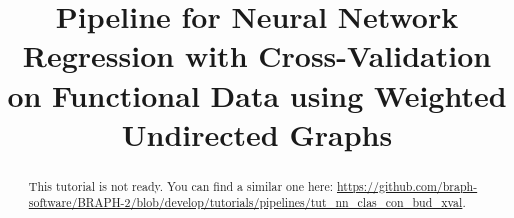 \documentclass[justified]{tufte-handout}
\title[Regression Cross-Validation Functional WU Measure]{Pipeline for Neural Network Regression with Cross-Validation on Functional Data using Weighted Undirected Graphs}
\begin{document}
\maketitle

\begin{abstract}
\noindent
This tutorial is not ready. You can find a similar one here: \url{https://github.com/braph-software/BRAPH-2/blob/develop/tutorials/pipelines/tut_nn_clas_con_bud_xval}.
\end{abstract}
\end{document}
